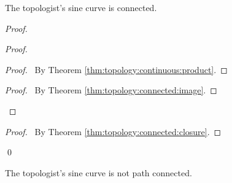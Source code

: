 \begin{prop}
  The topologist's sine curve is connected.
\end{prop}

\begin{proof}
  \pf
  \begin{proof}
    \begin{proof}
      \pf\ By Theorem \ref{thm:topology:continuous:product}.
    \end{proof}
    \qedstep
    \begin{proof}
      \pf\ By Theorem \ref{thm:topology:connected:image}.
    \end{proof}
  \end{proof}
  \qedstep
  \begin{proof}
    \pf\ By Theorem \ref{thm:topology:connected:closure}.
  \end{proof}
  \qed
\end{proof}

\begin{prop}[CC]
  The topologist's sine curve is not path connected.
\end{prop}

